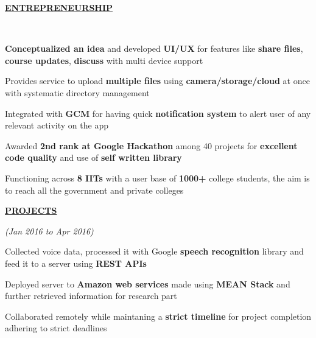 \documentclass[a4paper]{deedy-resume} %
\begin{document}
\sectionspace

{\uppercase\uline{\textbf{\large{Entrepreneurship}}\hfill}}
\microspace

\hfill \\

\begin{tightitemize}
\item \textbf{Conceptualized an idea} and developed \textbf{UI/UX} for features like \textbf{share files}, \textbf{course updates}, \textbf{discuss} with multi device support
\item Provides service to upload \textbf{multiple files} using \textbf{camera/storage/cloud} at once with systematic directory management
\item Integrated with \textbf{GCM} for having quick \textbf{notification system} to alert user of any relevant activity on the app
\item Awarded \textbf{2nd rank at Google Hackathon} among 40 projects for \textbf{excellent code quality} and use of \textbf{self written library}
\item Functioning across \textbf{8 IITs} with a user base of \textbf{1000+} college students, the aim is to reach all the government and private colleges
\end{tightitemize}

\sectionspace


{\uppercase\uline{\textbf{\large{Projects}}\hfill}}

\microspace

\hfill {\textit{\small(Jan 2016 to Apr 2016)}}\\
	
\begin{tightitemize}
\item  Collected voice data, processed it with Google \textbf{speech recognition} library and feed it to a server using \textbf{REST APIs}
\item  Deployed server to \textbf{Amazon web services} made using \textbf{MEAN Stack} and further retrieved information for research part
\item  Collaborated remotely while maintaning a \textbf{strict timeline} for project completion adhering to strict deadlines
\microspace

\end{tightitemize}
\end{document}
